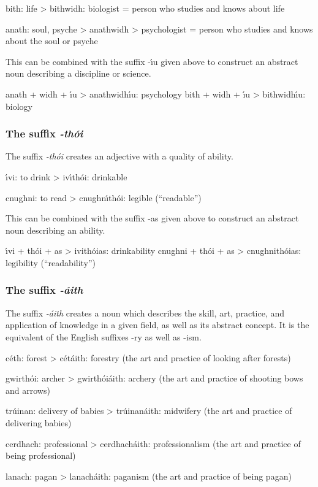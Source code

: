 bith: life
> bithwidh: biologist = person who studies and knows about life
 
anath: soul, psyche
> anathwidh > psychologist = person who studies and knows about the soul or psyche

This can be combined with the suffix -\'{\i}u given above to construct an abstract noun describing a discipline or science.

anath + widh + \'{\i}u > anathwidh\'{\i}u: psychology
bith + widh + \'{\i}u > bithwidh\'{\i}u: biology

\subsubsection{The suffix \textit{-th\'{o}i}}

The suffix \textit{-th\'{o}i} creates an adjective with a quality of ability.

\'{\i}vi: to drink
> iv\'{\i}th\'{o}i: drinkable

cnughni: to read
> cnughn\'{\i}th\'{o}i: legible (``readable'')

This can be combined with the suffix -as given above to construct an abstract noun describing an ability.

\'{\i}vi + th\'{o}i + as > ivith\'{o}ias: drinkability
cnughni + th\'{o}i + as > cnughnith\'{o}ias: legibility (``readability'')

\subsubsection{The suffix \textit{-\'{a}ith}}

The suffix \textit{-\'{a}ith} creates a noun which describes the skill, art, practice, and application of knowledge in a given field, as well as its abstract concept. It is the equivalent of the English suffixes -ry as well as -ism.

c\'{e}th: forest
> c\'{e}t\'{a}ith: forestry (the art and practice of looking after forests)

gwirth\'{o}i: archer
> gwirth\'{o}i\'{a}ith: archery (the art and practice of shooting bows and arrows)

tr\'{u}inan: delivery of babies
> tr\'{u}inan\'{a}ith: midwifery (the art and practice of delivering babies)

cerdhach: professional
> cerdhach\'{a}ith: professionalism (the art and practice of being professional)

lanach: pagan
> lanach\'{a}ith: paganism (the art and practice of being pagan)


